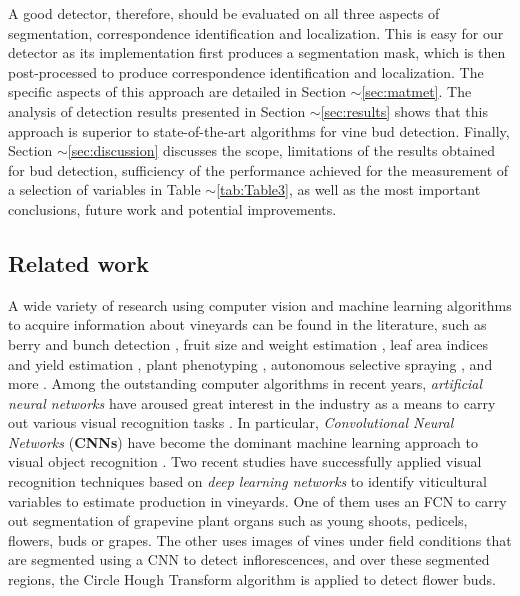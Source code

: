 \documentclass[a4paper,authoryear,review]{elsarticle}
\begin{document}
	A good detector, therefore, should be evaluated on all three aspects of segmentation, correspondence identification and localization. This is easy for our detector as its implementation first produces a segmentation mask, which is then post-processed to produce correspondence identification and localization. The specific aspects of this approach are detailed in Section $\sim$\ref{sec:matmet}. The analysis of detection results presented in Section $\sim$\ref{sec:results} shows that this approach is superior to state-of-the-art algorithms for vine bud detection. Finally, Section $\sim$\ref{sec:discussion} discusses the scope, limitations of the results obtained for bud detection, sufficiency of the performance achieved for the measurement of a selection of variables in Table $\sim$\ref{tab:Table3}, as well as the most important conclusions, future work and potential improvements.
	
	\subsection{Related work}
	\label{sec:related}
	A wide variety of research using computer vision and machine learning algorithms to acquire information about vineyards \citep{seng2018computer} can be found in the literature, such as berry and bunch detection \citep{nuske2011yield}, fruit size and weight estimation \citep{tardaguila2012automatic}, leaf area indices and yield estimation \citep{diago2012grapevine}, plant phenotyping \citep{herzog2014objective, herzog2014initial}, autonomous selective spraying \citep{berenstein2010grape}, and more \citep{tardaguila2012applications, whalley2013applications}. Among the outstanding computer algorithms in recent years, \emph{artificial neural networks} have aroused great interest in the industry as a means to carry out various visual recognition tasks \citep{hirano2006industry, kahng2017cti, tilgner2019multi}. In particular, \emph{Convolutional Neural Networks} (\textbf{CNNs}) have become the dominant machine learning approach to visual object recognition \citep{ning2017inception}. Two recent studies have successfully applied visual recognition techniques based on \emph{deep learning networks} to identify viticultural variables to estimate production in vineyards. One of them \citet{grimm2019adaptable} uses an FCN to carry out segmentation of grapevine plant organs such as young shoots, pedicels, flowers, buds or grapes. The other \citet{rudolph2018efficient} uses images of vines under field conditions that are segmented using a CNN to detect inflorescences, and over these segmented regions, the Circle Hough Transform algorithm is applied to detect flower buds.
	
\end{document}
